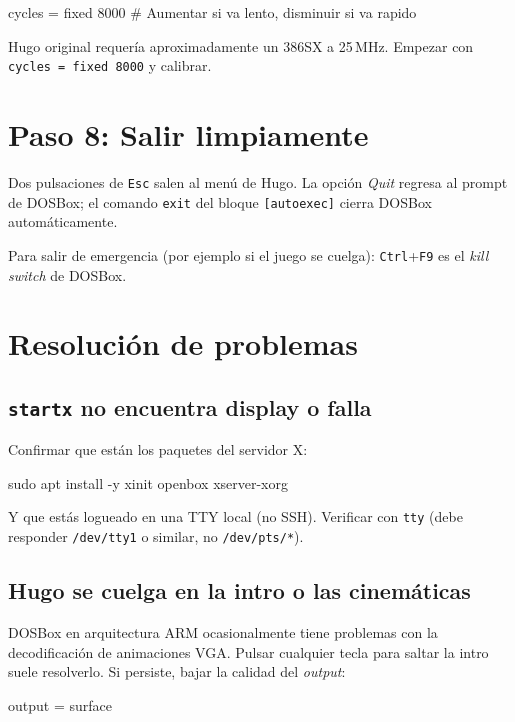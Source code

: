 \begin{nota}
\begin{tomlcode}
[cpu]
cycles = fixed 8000   # Aumentar si va lento, disminuir si va rapido
\end{tomlcode}

Hugo original requería aproximadamente un 386SX a 25\,MHz. Empezar con \texttt{cycles = fixed 8000} y calibrar.

\section{Paso 8: Salir limpiamente}

Dos pulsaciones de \texttt{Esc} salen al menú de Hugo. La opción \emph{Quit} regresa al prompt de DOSBox; el comando \texttt{exit} del bloque \texttt{[autoexec]} cierra DOSBox automáticamente.

Para salir de emergencia (por ejemplo si el juego se cuelga): \texttt{Ctrl}+\texttt{F9} es el \emph{kill switch} de DOSBox.

\section{Resolución de problemas}

\subsection{\texttt{startx} no encuentra display o falla}

Confirmar que están los paquetes del servidor X:

\begin{shellcode}
sudo apt install -y xinit openbox xserver-xorg
\end{shellcode}

Y que estás logueado en una TTY local (no SSH). Verificar con \texttt{tty} (debe responder \texttt{/dev/tty1} o similar, no \texttt{/dev/pts/*}).

\subsection{Hugo se cuelga en la intro o las cinemáticas}

DOSBox en arquitectura ARM ocasionalmente tiene problemas con la decodificación de animaciones VGA. Pulsar cualquier tecla para saltar la intro suele resolverlo. Si persiste, bajar la calidad del \emph{output}:

\begin{tomlcode}
[sdl]
output = surface
\end{tomlcode}


\end{nota}
